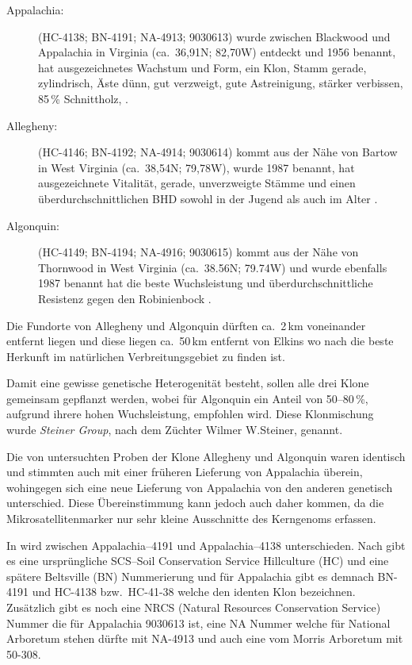 \documentclass[twocolumn]{scrartcl}
\begin{document}
\begin{description}
  \item[Appalachia:] (HC-4138; BN-4191; NA-4913; 9030613) wurde zwischen
Blackwood und Appalachia in Virginia (ca.~36,91N; 82,70W) entdeckt und 1956
benannt, hat ausgezeichnetes Wachstum und Form, ein Klon, Stamm gerade,
zylindrisch, Äste dünn, gut verzweigt, gute Astreinigung, stärker verbissen,
85\,\% Schnittholz, \citep{steinergroup1987robinie,zsombor1980robinie,kapusi1995robinie}.
  \item[Allegheny:]  (HC-4146; BN-4192; NA-4914; 9030614) kommt aus der Nähe von
Bartow in West Virginia (ca.~38,54N; 79,78W), wurde 1987 benannt, hat
ausgezeichnete Vitalität, gerade, unverzweigte Stämme und einen
überdurchschnittlichen BHD sowohl in der Jugend als auch im Alter \citep{steinergroup1987robinie}.
  \item[Algonquin:] (HC-4149; BN-4194; NA-4916; 9030615) kommt aus der Nähe von
Thornwood in West Virginia (ca.~38.56N; 79.74W) und wurde ebenfalls 1987 benannt
hat die beste Wuchsleistung und überdurchschnittliche Resistenz gegen den
Robinienbock \citep{steinergroup1987robinie}.
\end{description}

Die Fundorte von Allegheny und Algonquin dürften ca.\ 2\,km
voneinander entfernt liegen und diese liegen ca.\ 50\,km entfernt von
Elkins wo nach \citet{hopp1941robinie} die beste Herkunft im
natürlichen Verbreitungsgebiet zu finden ist.

Damit eine gewisse genetische Heterogenität besteht, sollen alle drei
Klone gemeinsam gepflanzt werden, wobei für Algonquin ein Anteil von
50--80\,\%, aufgrund ihrere hohen Wuchsleistung, empfohlen wird. Diese
Klonmischung wurde \emph{Steiner Group}, nach dem Züchter Wilmer
W.Steiner, genannt.

Die von \citet{liesebach2012robinie} untersuchten Proben der Klone
Allegheny und Algonquin waren identisch und stimmten auch mit einer
früheren Lieferung von Appalachia überein, wohingegen sich eine neue
Lieferung von Appalachia von den anderen genetisch unterschied.  Diese
Übereinstimmung kann jedoch auch daher kommen, da die
Mikrosatellitenmarker nur sehr kleine Ausschnitte des Kerngenoms
erfassen.

In \citet{liesebach2021robinie} wird zwischen Appalachia--4191 und
Appalachia--4138 unterschieden. Nach \citet{steinergroup1987robinie}
gibt es eine ursprüngliche SCS--Soil Conservation Service Hillculture
(HC) und eine spätere Beltsville (BN) Nummerierung und für Appalachia
gibt es demnach BN-4191 und HC-4138 bzw.\ HC-41-38 welche den identen
Klon bezeichnen. Zusätzlich gibt es noch eine NRCS (Natural Resources
Conservation Service) Nummer die für Appalachia 9030613 ist, eine NA
Nummer welche für National Arboretum stehen dürfte mit NA-4913 und
auch eine vom Morris Arboretum mit 50-308.
\end{document}
